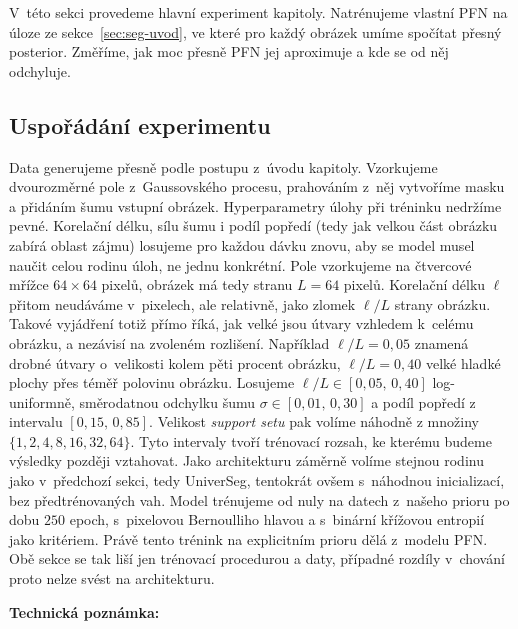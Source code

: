 V~této sekci provedeme hlavní experiment kapitoly.
Natrénujeme vlastní PFN na úloze ze sekce~\ref{sec:seg-uvod}, ve které pro každý obrázek umíme spočítat přesný posterior.
Změříme, jak moc přesně PFN jej aproximuje a kde se od něj odchyluje.
\par

\subsection{Uspořádání experimentu}
\label{subsec:seg-c-setup}

Data generujeme přesně podle postupu z~úvodu kapitoly.
Vzorkujeme dvourozměrné pole z~Gaussovského procesu, prahováním z~něj vytvoříme masku a přidáním šumu vstupní obrázek.
Hyperparametry úlohy při tréninku nedržíme pevné.
Korelační délku, sílu šumu i podíl popředí (tedy jak velkou část obrázku zabírá oblast zájmu) losujeme pro každou dávku znovu, aby se model musel naučit celou rodinu úloh, ne jednu konkrétní.
Pole vzorkujeme na čtvercové mřížce $64 \times 64$ pixelů, obrázek má tedy stranu $L = 64$ pixelů.
Korelační délku $\ell$ přitom neudáváme v~pixelech, ale relativně, jako zlomek $\ell/L$ strany obrázku.
Takové vyjádření totiž přímo říká, jak velké jsou útvary vzhledem k~celému obrázku, a nezávisí na zvoleném rozlišení.
Například $\ell/L = 0{,}05$ znamená drobné útvary o~velikosti kolem pěti procent obrázku, $\ell/L = 0{,}40$ velké hladké plochy přes téměř polovinu obrázku.
Losujeme $\ell/L \in [0{,}05,\, 0{,}40]$ log-uniformně, směrodatnou odchylku šumu $\sigma \in [0{,}01,\, 0{,}30]$ a podíl popředí z intervalu $[0{,}15,\, 0{,}85]$.
Velikost \emph{support setu} pak volíme náhodně z množiny $\{1, 2, 4, 8, 16, 32, 64\}$.
Tyto intervaly tvoří trénovací rozsah, ke kterému budeme výsledky později vztahovat.
Jako architekturu záměrně volíme stejnou rodinu jako v~předchozí sekci, tedy UniverSeg, tentokrát ovšem s~náhodnou inicializací, bez předtrénovaných vah.
Model trénujeme od nuly na datech z~našeho prioru po dobu $250$ epoch, s~pixelovou Bernoulliho hlavou a s~binární křížovou entropií jako kritériem.
Právě tento trénink na explicitním prioru dělá z~modelu PFN.
Obě sekce se tak liší jen trénovací procedurou a daty, případné rozdíly v~chování proto nelze svést na architekturu.
\par

\textbf{Technická poznámka:}

